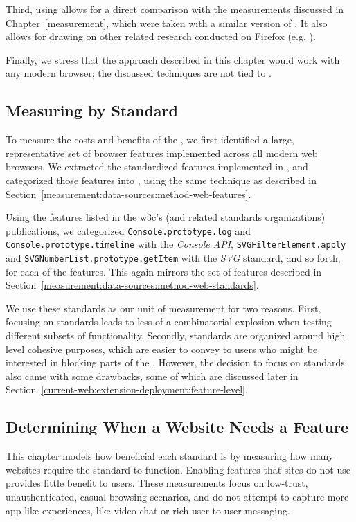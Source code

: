 Third, using \FF allows for a direct comparison with the measurements
discussed in Chapter~\ref{measurement}, which were taken with a similar version
of \FF.  It also allows for drawing on other related research conducted on
Firefox (e.g. \cite{shin2011evaluating}).

Finally, we stress that the approach described in this chapter would work with
any modern browser; the discussed techniques are not tied to \FFWithVersion.


\subsection{Measuring by Standard}
To measure the costs and benefits of the \WAPI, we first identified a large,
representative set of browser features implemented across all modern web
browsers.  We extracted the \numfeatures standardized \WAPI features
implemented in \FF, and categorized those features into \NumStandards \WASs,
using the same technique as described in
Section~\ref{measurement:data-sources:method-web-features}.

Using the features listed in the \gls{w3c}'s (and related standards
organizations) publications, we categorized \texttt{Console.prototype.log} and
\texttt{Console.prototype.timeline} with the \textit{Console API},
\texttt{SVGFilterElement.apply} and \texttt{SVGNumberList.prototype.getItem}
with the \textit{SVG} standard, and so forth, for each of the \numfeatures
features.  This again mirrors the set of features described in
Section~\ref{measurement:data-sources:method-web-standards}.

We use these \NumStandards standards as our unit of \WAPI measurement for two
reasons.  First, focusing on \NumStandards standards leads to less of a
combinatorial explosion when testing different subsets of \WAPI functionality.
Secondly, standards are organized around high level cohesive purposes, which
are easier to convey to users who might be interested in blocking parts of the
\WAPI. However, the decision to focus on standards also came with some
drawbacks, some of which are discussed later in
Section~\ref{current-web:extension-deployment:feature-level}.


\subsection{Determining When a Website Needs a Feature}
\label{cost-benefit:methodology:manual-inspection}
This chapter models how beneficial each \WAPI standard is by measuring how many
websites require the standard to function.  Enabling features that sites do not
use provides little benefit to users.  These measurements focus on low-trust,
unauthenticated, casual browsing scenarios, and do not attempt to capture more
app-like experiences, like video chat or rich user to user messaging.

